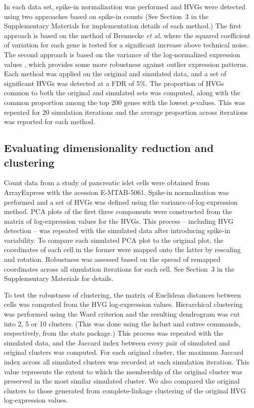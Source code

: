 \documentclass{article}
\newcommand{\suppsecsim}{3}
\begin{document}
In each data set, spike-in normalization was performed and HVGs were detected using two approaches based on spike-in counts 
(See Section~\suppsecsim{} in the Supplementary Materials for implementation details of each method.)
The first approach is based on the method of Brennecke \textit{et al.} \cite{brennecke2013accounting} where the squared coefficient of variation for each gene is tested for a significant increase above technical noise.
The second approach is based on the variance of the log-normalized expression values \cite{lun2016stepbystep}, which provides some more robustness against outlier expression patterns.
Each method was applied on the original and simulated data, and a set of significant HVGs was detected at a FDR of 5\%.
The proportion of HVGs common to both the original and simulated sets was computed, along with the common proportion among the top 200 genes with the lowest $p$-values.
This was repeated for 20 simulation iterations and the average proportion across iterations was reported for each method.

\subsection{Evaluating dimensionality reduction and clustering}
Count data from a study of pancreatic islet cells \cite{segerstople2016single} were obtained from ArrayExpress with the acession E-MTAB-5061.
Spike-in normalization was performed and a set of HVGs was defined using the variance-of-log-expression method.
PCA plots of the first three components were constructed from the matrix of log-expression values for the HVGs.
This process -- including HVG detection -- was repeated with the simulated data after introducing spike-in variability.
To compare each simulated PCA plot to the original plot, the coordinates of each cell in the former were mapped onto the latter by rescaling and rotation.
Robustness was assessed based on the spread of remapped coordinates across all simulation iterations for each cell.
See Section~\suppsecsim{} in the Supplementary Materials for details.

To test the robustness of clustering, the matrix of Euclidean distances between cells was computed from the HVG log-expression values. 
Hierarchical clustering was performed using the Ward criterion and the resulting dendrogram was cut into 2, 5 or 10 clusters.
(This was done using the hclust and cutree commands, respectively, from the stats package.)
This process was repeated with the simulated data, and the Jaccard index between every pair of simulated and original clusters was computed.
For each original cluster, the maximum Jaccard index across all simulated clusters was recorded at each simulation iteration.
This value represents the extent to which the membership of the original cluster was preserved in the most similar simulated cluster.
We also compared the original clusters to those generated from complete-linkage clustering of the original HVG log-expression values.
\end{document}
